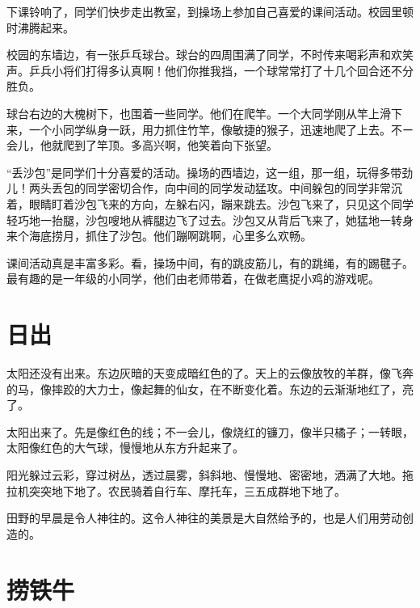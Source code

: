 \documentclass[12pt,UTF-8,openany]{ctexbook}
\begin{document}
\begin{large}
    
    下课铃响了，同学们快步走出教室，到操场上参加自己喜爱的课间活动。校园里顿时沸腾起来。
    
    校园的东墙边，有一张乒乓球台。球台的四周围满了同学，不时传来喝彩声和欢笑声。乒兵小将们打得多认真啊！他们你推我挡，一个球常常打了十几个回合还不分胜负。
    
    球台右边的大槐树下，也围着一些同学。他们在爬竿。一个大同学刚从竿上滑下来，一个小同学纵身一跃，用力抓住竹竿，像敏捷的猴子，迅速地爬了上去。不ー会儿，他就爬到了竿顶。多高兴啊，他笑着向下张望。
    
    “丢沙包”是同学们十分喜爱的活动。操场的西墙边，这一组，那一组，玩得多带劲儿！两头丢包的同学密切合作，向中间的同学发动猛攻。中间躲包的同学非常沉着，眼睛盯着沙包飞来的方向，左躲右闪，蹦来跳去。沙包飞来了，只见这个同学轻巧地一抬腿，沙包嗖地从裤腿边飞了过去。沙包又从背后飞来了，她猛地一转身来个海底捞月，抓住了沙包。他们蹦啊跳啊，心里多么欢畅。
    
    课间活动真是丰富多彩。看，操场中间，有的跳皮筋儿，有的跳绳，有的踢毽子。最有趣的是一年级的小同学，他们由老师带着，在做老鹰捉小鸡的游戏呢。
    
\end{large}



\chapter{日出}

\begin{large}
    
    太阳还没有出来。东边灰暗的天变成暗红色的了。天上的云像放牧的羊群，像飞奔的马，像摔跤的大力士，像起舞的仙女，在不断变化着。东边的云渐渐地红了，亮了。
    
    太阳出来了。先是像红色的线；不一会儿，像烧红的镰刀，像半只橘子；一转眼，太阳像红色的大气球，慢慢地从东方升起来了。
    
    阳光躲过云彩，穿过树丛，透过晨雾，斜斜地、慢慢地、密密地，洒满了大地。拖拉机突突地下地了。农民骑着自行车、摩托车，三五成群地下地了。
    
    田野的早晨是令人神往的。这令人神往的美景是大自然给予的，也是人们用劳动创造的。
    
\end{large}



\chapter{捞铁牛}
\end{document}
